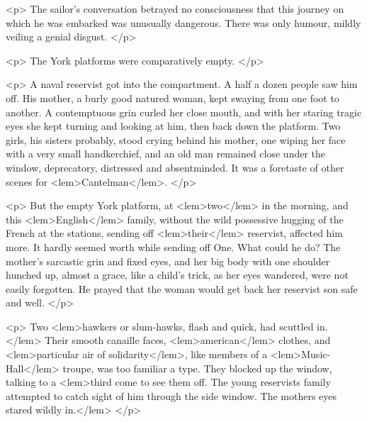{{				<p>
					The sailor's conversation betrayed no consciousness that this journey on which he was 
					embarked was unusually dangerous. There was only humour, mildly veiling a genial 
					disgust. 
 				</p>

				<p>
					The York platforms were comparatively empty. 
 				</p>

				<p>
					A naval reservist got into the compartment. A half a dozen people saw him off. His 
					mother, a burly good natured woman, kept swaying from one foot to another. A contemptuous 
					grin curled her close mouth, and with her staring tragic eyes she kept turning 
					and looking at him, then back down the platform. Two girls, his sisters probably, 
					stood crying behind his mother, one wiping her face with a very small handkerchief, 
					and an old man remained close under the window, deprecatory, distressed and absentminded. 
					It was a foretaste of other scenes for 
<lem>Cantelman</lem>{}. 
 				</p>

				<p>
					But the empty York platform, at 
<lem>two</lem>
						{} 
					in the morning, and this 
<lem>English</lem>
						{} 
					family, without 
					the wild possessive hugging of the French at the stations, sending off 
<lem>their</lem>
						{} 
					reservist, 
					affected him more. It hardly seemed worth while sending off One. What could he do? 
					The mother's sarcastic grin and fixed eyes, and her big body with one shoulder hunched 
					up, almost a grace, like a child's trick, as her eyes wandered, were not easily 
					forgotten. He prayed that the woman would get back her reservist son safe and well. 
 				</p>

				<p>
					Two 
<lem>hawkers or slum-hawks, flash and quick, had scuttled in.</lem>
						{} 
					Their smooth canaille faces, 
<lem>american</lem>
						{} 
					clothes, 
					and 
<lem>particular air of solidarity</lem>{}, 
					like members of a 
<lem>Music-Hall</lem>
						{} 
					troupe, was too 
					familiar a type. They blocked up the window, talking to a 
<lem>third come to see them off. The young reservists family attempted to catch sight of him through the side window. The mothers eyes stared wildly in.</lem>
						{} 
 				</p>

}}
